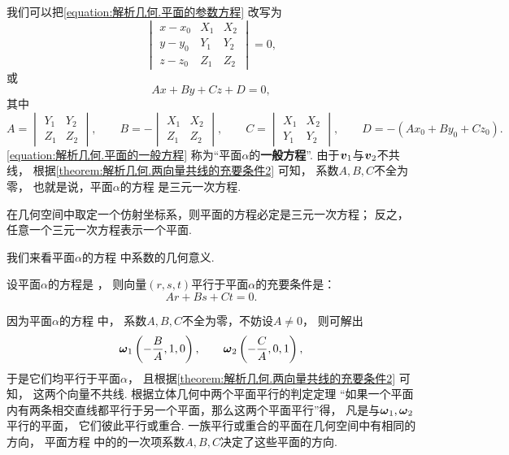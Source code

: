 我们可以把\cref{equation:解析几何.平面的参数方程} 改写为
\begin{equation}
	\begin{vmatrix}
		x - x_0 & X_1 & X_2 \\
		y - y_0 & Y_1 & Y_2 \\
		z - z_0 & Z_1 & Z_2
	\end{vmatrix} = 0,
\end{equation}
或\begin{equation}\label{equation:解析几何.平面的一般方程}
	A x + B y + C z + D = 0,
\end{equation}
其中\[
	A = \begin{vmatrix}
		Y_1 & Y_2 \\
		Z_1 & Z_2
	\end{vmatrix},
	\qquad
	B = -\begin{vmatrix}
		X_1 & X_2 \\
		Z_1 & Z_2
	\end{vmatrix},
	\qquad
	C = \begin{vmatrix}
		X_1 & X_2 \\
		Y_1 & Y_2
	\end{vmatrix},
	\qquad
	D = - (A x_0 + B y_0 + C z_0).
\]
\cref{equation:解析几何.平面的一般方程}
称为“平面\(\alpha\)的\textbf{一般方程}”.
由于\(\boldsymbol{v}_1\)与\(\boldsymbol{v}_2\)不共线，
根据\cref{theorem:解析几何.两向量共线的充要条件2} 可知，
系数\(A,B,C\)不全为零，
也就是说，平面\(\alpha\)的方程  是三元一次方程.

\begin{theorem}
在几何空间中取定一个仿射坐标系，则平面的方程必定是三元一次方程；
反之，任意一个三元一次方程表示一个平面.
\end{theorem}

我们来看平面\(\alpha\)的方程  中系数的几何意义.

\begin{theorem}
设平面\(\alpha\)的方程是 ，
则向量\((r,s,t)\)平行于平面\(\alpha\)的充要条件是：\[
	Ar+Bs+Ct = 0.
\]
\end{theorem}

因为平面\(\alpha\)的方程  中，
系数\(A,B,C\)不全为零，不妨设\(A\neq0\)，
则可解出\[
	\boldsymbol{\omega}_1 \left( -\frac{B}{A},1,0 \right), \qquad
	\boldsymbol{\omega}_2 \left( -\frac{C}{A},0,1 \right),
\]
于是它们均平行于平面\(\alpha\)，
且根据\cref{theorem:解析几何.两向量共线的充要条件2} 可知，
这两个向量不共线.
根据立体几何中两个平面平行的判定定理
“如果一个平面内有两条相交直线都平行于另一个平面，那么这两个平面平行”得，
凡是与\(\boldsymbol{\omega}_1,\boldsymbol{\omega}_2\)平行的平面，
它们彼此平行或重合.
一族平行或重合的平面在几何空间中有相同的方向，
平面方程  中的的一次项系数\(A,B,C\)决定了这些平面的方向.


